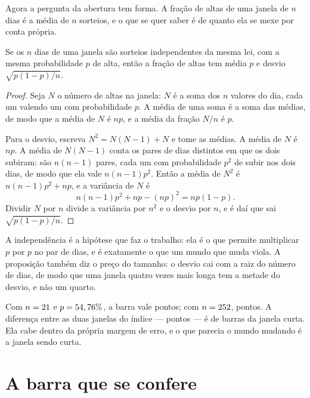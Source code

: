 Agora a pergunta da abertura tem forma. A fração de altas de uma janela de $n$ dias é a média
de $n$ sorteios, e o que se quer saber é de quanto ela se mexe por conta própria.

\begin{proposicao}\label{prop:barra}
Se os $n$ dias de uma janela são sorteios independentes da mesma lei, com a mesma probabilidade
$p$ de alta, então a fração de altas tem média $p$ e desvio
$\sqrt{p(1-p)/n}$.
\end{proposicao}

\begin{proof}
Seja $N$ o número de altas na janela: $N$ é a soma dos $n$ valores do dia, cada um valendo um
com probabilidade $p$. A média de uma soma é a soma das médias, de modo que a média de $N$ é
$np$, e a média da fração $N/n$ é $p$.

Para o desvio, escreva $N^2 = N(N-1) + N$ e tome as médias. A média de $N$ é $np$. A média de
$N(N-1)$ conta os pares de dias distintos em que os dois subiram: são $n(n-1)$ pares, cada um
com probabilidade $p^2$ de subir nos dois dias, de modo que ela vale $n(n-1)p^2$. Então a média
de $N^2$ é $n(n-1)p^2 + np$, e a variância de $N$ é
\[
  n(n-1)p^2 + np - (np)^2 = np(1-p).
\]
Dividir $N$ por $n$ divide a variância por $n^2$ e o desvio por $n$, e é daí que sai
$\sqrt{p(1-p)/n}$.
\end{proof}

A independência é a hipótese que faz o trabalho: ela é o que permite multiplicar $p$ por $p$ no
par de dias, e é exatamente o que um mundo que muda viola. A proposição também diz o preço do
tamanho: o desvio cai com a raiz do número de dias, de modo que uma janela quatro vezes mais
longa tem a metade do desvio, e não um quarto.

Com $n = 21$ e $p = 54,76\%$, a barra vale
\numBarraCurtaPct{} pontos; com $n = 252$, \numBarraLongaPct{} pontos. A
diferença entre as duas janelas do índice --- \numFracaoDiferencaPct{} pontos --- é de
\numFracaoDiferencaBarras{} barras da janela curta. Ela cabe dentro da própria margem de erro,
e o que parecia o mundo mudando é a janela sendo curta.

\section{A barra que se confere}

